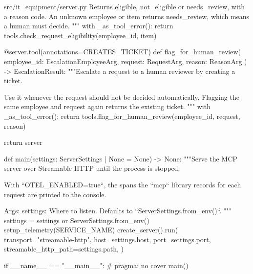 \documentclass[11pt,letterpaper]{article}
\renewcommand{\_}{\textunderscore\allowbreak}
\begin{document}
\begin{codebox}{src/it_equipment/server.py}
        Returns eligible, not_eligible or needs_review, with a reason code. An unknown
        employee or item returns needs_review, which means a human must decide.
        """
        with _as_tool_error():
            return tools.check_request_eligibility(employee_id, item)

    @server.tool(annotations=CREATES_TICKET)
    def flag_for_human_review(
        employee_id: EscalationEmployeeArg, request: RequestArg, reason: ReasonArg
    ) -> EscalationResult:
        """Escalate a request to a human reviewer by creating a ticket.

        Use it whenever the request should not be decided automatically. Flagging the same
        employee and request again returns the existing ticket.
        """
        with _as_tool_error():
            return tools.flag_for_human_review(employee_id, request, reason)

    return server


def main(settings: ServerSettings | None = None) -> None:
    """Serve the MCP server over Streamable HTTP until the process is stopped.

    With ``OTEL_ENABLED=true``, the spans the ``mcp`` library records for each request are
    printed to the console.

    Args:
        settings: Where to listen. Defaults to ``ServerSettings.from_env()``.
    """
    settings = settings or ServerSettings.from_env()
    setup_telemetry(SERVICE_NAME)
    create_server().run(
        transport="streamable-http",
        host=settings.host,
        port=settings.port,
        streamable_http_path=settings.path,
    )


if __name__ == "__main__":  # pragma: no cover
    main()
\end{codebox}
\end{document}
